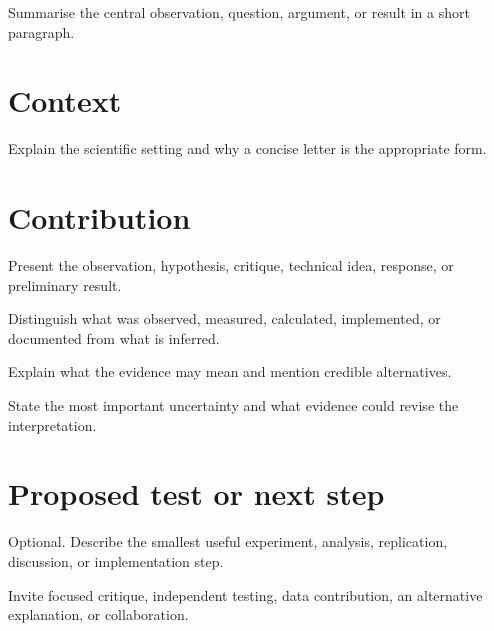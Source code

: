 \documentclass[11pt,a4paper]{article}
\begin{document}
\MakeGenesisTitle
\begin{GenesisAbstract}
Summarise the central observation, question, argument, or result in a short paragraph.
\end{GenesisAbstract}
\section{Context}
Explain the scientific setting and why a concise letter is the appropriate form.
\section{Contribution}
Present the observation, hypothesis, critique, technical idea, response, or preliminary result.
\begin{GenesisEvidence}
Distinguish what was observed, measured, calculated, implemented, or documented from
what is inferred.
\end{GenesisEvidence}
\begin{GenesisInterpretation}
Explain what the evidence may mean and mention credible alternatives.
\end{GenesisInterpretation}
\begin{GenesisLimitations}
State the most important uncertainty and what evidence could revise the interpretation.
\end{GenesisLimitations}
\section{Proposed test or next step}
Optional. Describe the smallest useful experiment, analysis, replication, discussion, or
implementation step.
\begin{GenesisAction}
Invite focused critique, independent testing, data contribution, an alternative explanation,
or collaboration.
\end{GenesisAction}
\end{document}
